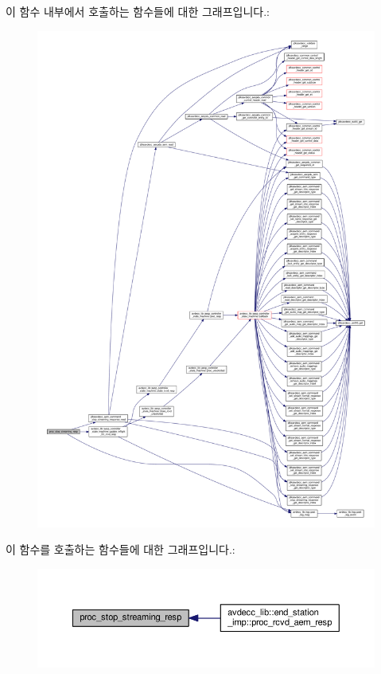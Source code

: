 이 함수 내부에서 호출하는 함수들에 대한 그래프입니다.\+:
\nopagebreak
\begin{figure}[H]
\begin{center}
\leavevmode
\includegraphics[width=350pt]{classavdecc__lib_1_1stream__output__descriptor__imp_a68bca93326a78c7c727b621208e3c804_cgraph}
\end{center}
\end{figure}




이 함수를 호출하는 함수들에 대한 그래프입니다.\+:
\nopagebreak
\begin{figure}[H]
\begin{center}
\leavevmode
\includegraphics[width=350pt]{classavdecc__lib_1_1stream__output__descriptor__imp_a68bca93326a78c7c727b621208e3c804_icgraph}
\end{center}
\end{figure}


